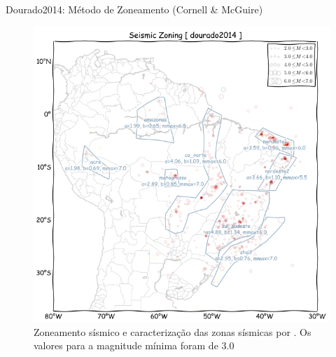 \documentclass[ucs,8pt]{beamer}
\begin{document}
\begin{frame}{Dourado2014: Método de Zoneamento (Cornell \& McGuire)}
\begin{figure}[H]
  \centering
  \includegraphics[height=.93\textheight]{a_dourado} 
  \caption{Zoneamento sísmico e caracterização das zonas sísmicas por \citep{dourado_2014}.
  Os valores para a magnitude mínima foram de 3.0}
  \label{fig:a_dourado} 
\end{figure}
\end{frame}
\end{document}
